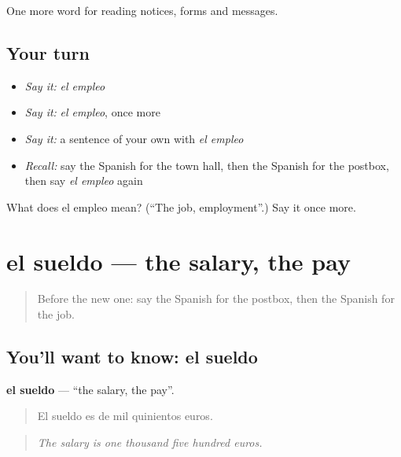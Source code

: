 \begin{grammarlens}[title={What you've built}]
One more word for reading notices, forms and messages.
\end{grammarlens}

\subsection*{Your turn}
\begin{itemize}
\raggedright
  \item \emph{Say it:} \emph{el empleo}
  \item \emph{Say it:} \emph{el empleo}, once more
  \item \emph{Say it:} a sentence of your own with \emph{el empleo}
  \item \emph{Recall:} say the Spanish for the town hall, then the Spanish for the postbox, then say \emph{el empleo} again
\end{itemize}

\begin{tcolorbox}[breakable,colback=teal!4,colframe=teal!35!black,title={Before you move on}]
What does el empleo mean? (\textquotedblleft{}The job, employment\textquotedblright{}.) Say it once more.
\end{tcolorbox}
\section[el sueldo]{el sueldo — the salary, the pay}

\label{lesson:ES-C490-sueldo}



\begin{quote}
Before the new one: say the Spanish for the postbox, then the Spanish for the job.
\end{quote}

\subsection*{You'll want to know: el sueldo}
\textbf{el sueldo} — \textquotedblleft{}the salary, the pay\textquotedblright{}.

\begin{quote}
El sueldo es de mil quinientos euros.
\end{quote}

\begin{quote}
\emph{The salary is one thousand five hundred euros.}
\end{quote}

